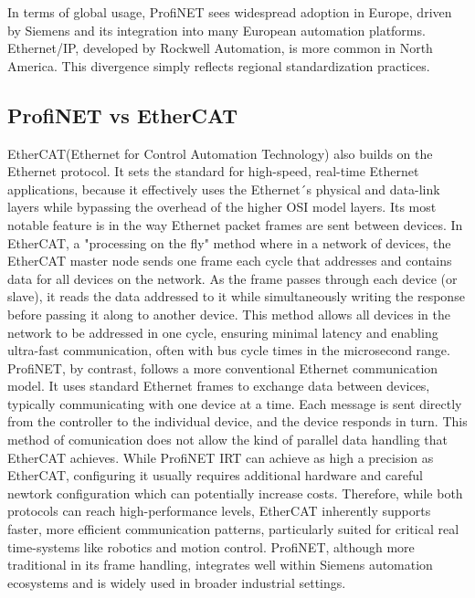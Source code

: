 \documentclass[conference]{IEEEtran}
\begin{document}
In terms of global usage, ProfiNET sees widespread adoption in Europe, driven by Siemens and its integration into many European automation platforms. Ethernet/IP, developed by Rockwell Automation, is more common in North America. This divergence simply reflects regional standardization practices.


\subsection{ProfiNET vs EtherCAT}
EtherCAT(Ethernet for Control Automation Technology) also builds on the Ethernet protocol. It sets the standard for high-speed, real-time Ethernet applications\cite{Rostan2010EtherCAT}, because it effectively uses the Ethernet´s physical and data-link layers while bypassing the overhead of the higher OSI model layers. Its most notable feature is in the way Ethernet packet frames are sent between devices. In EtherCAT, a "processing on the fly" method where in a network of devices, the EtherCAT master node sends one frame each cycle that addresses and contains data for all devices on the network. As the frame passes through each device (or slave), it reads the data addressed to it while simultaneously writing the response before passing it along to another device\cite{DewesoftEtherCAT2023}. This method allows all devices in the network to be addressed in one cycle, ensuring minimal latency and enabling ultra-fast communication, often with bus cycle times in the microsecond range\cite{Rostan2010EtherCAT}.
ProfiNET, by contrast, follows a more conventional Ethernet communication model. It uses standard Ethernet frames to exchange data between devices, typically communicating with one device at a time. Each message is sent directly from the controller to the individual device, and the device responds in turn. This method of comunication does not allow the kind of parallel data handling that EtherCAT achieves. While ProfiNET IRT can achieve as high a precision as EtherCAT, configuring it usually requires additional hardware and careful newtork configuration \cite{WuXie2019} which can potentially increase costs.
Therefore, while both protocols can reach high-performance levels, EtherCAT inherently supports faster, more efficient communication patterns, particularly suited for critical real time-systems like robotics and motion control\cite{BeckhoffETG2023}. ProfiNET, although more traditional in its frame handling, integrates well within Siemens automation ecosystems and is widely used in broader industrial settings\cite{Eitel2020EtherNetVsPROFINET}.
\end{document}
